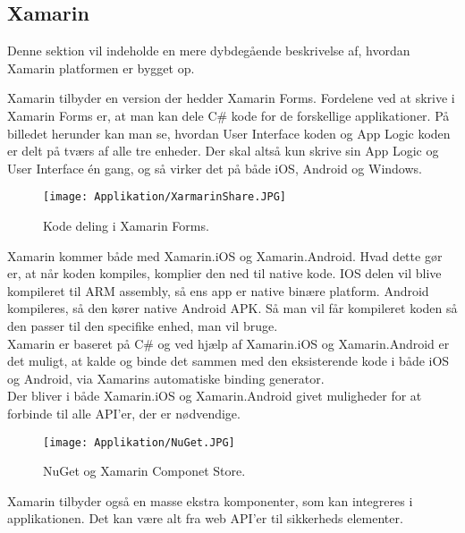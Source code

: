 \subsection{Xamarin}
Denne sektion vil indeholde en mere dybdegående beskrivelse af, hvordan Xamarin platformen er bygget op.

Xamarin tilbyder en version der hedder Xamarin Forms. Fordelene ved at skrive i Xamarin Forms er, at man kan dele C\# kode for de forskellige applikationer.
På billedet herunder kan man se, hvordan User Interface koden og App Logic koden er delt på tværs af alle tre enheder. Der skal altså kun skrive sin App Logic og User Interface én gang, og så virker det på både iOS, Android og Windows.
\begin{figure}[H]
	\centering
	\texttt{[image: Applikation/XarmarinShare.JPG]}
	\caption{Kode deling i Xamarin Forms.\cite{Xarmain}}
	\label{fig:CodeShare}
\end{figure}

\clearpage

Xamarin kommer både med Xamarin.iOS og Xamarin.Android. Hvad dette gør er, at når koden kompiles, komplier den ned til native kode. IOS delen vil blive kompileret til ARM assembly, så ens app er native binære platform. Android kompileres, så den kører native Android APK. Så man vil får kompileret koden så den passer til den specifike enhed, man vil bruge. \\
Xamarin er baseret på C\# og ved hjælp af Xamarin.iOS og Xamarin.Android er det muligt, at kalde og binde det sammen med den eksisterende kode i både iOS og Android, via Xamarins automatiske binding generator. \\
Der bliver i både Xamarin.iOS og Xamarin.Android givet muligheder for at forbinde til alle API'er, der er nødvendige. \\

\begin{figure}[H]
	\centering
	\texttt{[image: Applikation/NuGet.JPG]}
	\caption{NuGet og Xamarin Componet Store.\cite{Xarmain}}
	\label{fig:NuGet}
\end{figure}
Xamarin tilbyder også en masse ekstra komponenter, som kan integreres i applikationen. Det kan være alt fra web API'er til sikkerheds elementer.

\clearpage